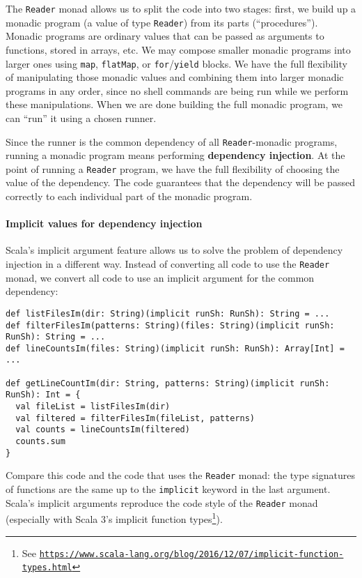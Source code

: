 The \lstinline!Reader! monad allows us to split the code into two
stages: first, we build up a monadic program (a value of type \lstinline!Reader!)
from its parts (\textsf{``}procedures\textsf{''}). Monadic programs are ordinary values
that can be passed as arguments to functions, stored in arrays, etc.
We may compose smaller monadic programs into larger ones using \lstinline!map!,
\lstinline!flatMap!, or \lstinline!for!/\lstinline!yield! blocks.
We have the full flexibility of manipulating those monadic values
and combining them into larger monadic programs in any order, since
no shell commands are being run while we perform these manipulations.
When we are done building the full monadic program, we can \textsf{``}run\textsf{''}
it using a chosen runner.

Since the runner is the common dependency of all \lstinline!Reader!-monadic
programs, running a monadic program means performing \textbf{dependency
injection}. At the point of running a
\lstinline!Reader! program, we have the full flexibility of choosing
the value of the dependency. The code guarantees that the dependency
will be passed correctly to each individual part of the monadic program.

\paragraph{Implicit values for dependency injection}

Scala\textsf{'}s implicit argument feature allows us to solve the problem of
dependency injection in a different way. Instead of converting all
code to use the \lstinline!Reader! monad, we convert all code to
use an implicit argument for the common dependency:
\begin{lstlisting}
def listFilesIm(dir: String)(implicit runSh: RunSh): String = ...
def filterFilesIm(patterns: String)(files: String)(implicit runSh: RunSh): String = ...
def lineCountsIm(files: String)(implicit runSh: RunSh): Array[Int] = ...

def getLineCountIm(dir: String, patterns: String)(implicit runSh: RunSh): Int = {
  val fileList = listFilesIm(dir)
  val filtered = filterFilesIm(fileList, patterns)
  val counts = lineCountsIm(filtered)
  counts.sum
}
\end{lstlisting}
Compare this code and the code that uses the \lstinline!Reader! monad:
the type signatures of functions are the same up to the \lstinline!implicit!
keyword in the last argument. Scala\textsf{'}s implicit arguments reproduce
the code style of the \lstinline!Reader! monad (especially with Scala
3\textsf{'}s implicit function types\footnote{See \texttt{\href{https://www.scala-lang.org/blog/2016/12/07/implicit-function-types.html}{https://www.scala-lang.org/blog/2016/12/07/implicit-function-types.html}}}).

